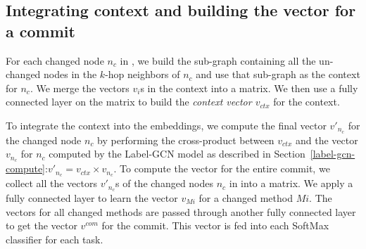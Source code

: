 

\subsection{Integrating context and building the vector for a commit}
\label{class:sec}

For each changed node $n_c$ in {\mvpdgxy}, we build the sub-graph
containing all the un-changed nodes in the $k$-hop neighbors of $n_c$
and use that sub-graph as the context for $n_c$. We merge the vectors $v_i$s
in the context into a matrix. We then use a fully connected layer on
the matrix to build the {\em context vector $v_{ctx}$} for
the context.

To integrate the context into the embeddings, we compute the final
vector $v{'}_{n_{c}}$ for the changed node $n_c$ by performing the
cross-product between $v_{ctx}$ and the vector $v_{n_c}$ for $n_c$
computed by the Label-GCN model as described in
Section~\ref{label-gcn-compute}:$v{'}_{n_c} = v_{ctx} \times
v_{n_c}$.
To compute the vector for the entire commit, we collect all
the vectors $v{'}_{n_c}$s of the changed nodes $n_c$ in {\mvpdgxy}
into a matrix. We apply a fully connected layer to learn
the vector $v_{Mi}$ for a changed method $Mi$. The vectors for all changed
methods are passed through another fully connected layer to get the
vector $v^{com}$ for the commit. This vector is fed
into each SoftMax classifier for each task.

